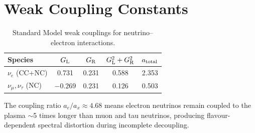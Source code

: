\section{Weak Coupling Constants}\label{app:weak_couplings}

\begin{table}[tbp]
\centering
\caption{Standard Model weak couplings for neutrino--electron interactions.}
\begin{tabular}{lcccc}
\toprule
Species & $G_{\rm L}$ & $G_{\rm R}$ & $G_{\rm L}^2 + G_{\rm R}^2$ & $a_{\rm total}$ \\
\midrule
$\nu_e$ (CC+NC) & 0.731 & 0.231 & 0.588 & 2.353 \\
$\nu_\mu, \nu_\tau$ (NC) & $-0.269$ & 0.231 & 0.126 & 0.503 \\
\bottomrule
\end{tabular}
\end{table}

The coupling ratio $a_e/a_x \approx 4.68$ means electron neutrinos remain coupled to the plasma $\sim$5 times longer than muon and tau neutrinos, producing flavour-dependent spectral distortion during incomplete decoupling.

